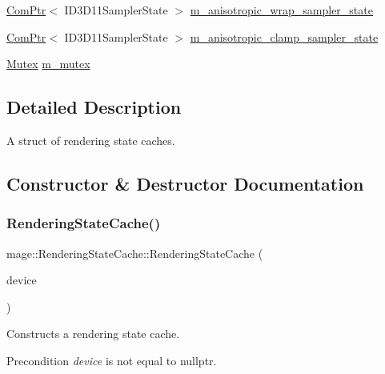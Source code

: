 \begin{DoxyCompactItemize}
\hyperlink{namespacemage_ae74f374780900893caa5555d1031fd79}{Com\+Ptr}$<$ I\+D3\+D11\+Sampler\+State $>$ \hyperlink{structmage_1_1_rendering_state_cache_ac44316b27ee83a1aeb9f8afc26b5a743}{m\+\_\+anisotropic\+\_\+wrap\+\_\+sampler\+\_\+state}
\item 
\hyperlink{namespacemage_ae74f374780900893caa5555d1031fd79}{Com\+Ptr}$<$ I\+D3\+D11\+Sampler\+State $>$ \hyperlink{structmage_1_1_rendering_state_cache_a56467ab3877bfb1fa547efe4e4a62cc7}{m\+\_\+anisotropic\+\_\+clamp\+\_\+sampler\+\_\+state}
\item 
\hyperlink{structmage_1_1_mutex}{Mutex} \hyperlink{structmage_1_1_rendering_state_cache_a97aad58b39eedbeeb27ed47c87ded52a}{m\+\_\+mutex}
\end{DoxyCompactItemize}


\subsection{Detailed Description}
A struct of rendering state caches. 

\subsection{Constructor \& Destructor Documentation}
\hypertarget{structmage_1_1_rendering_state_cache_ad818eaa6c950c5851d6e684b9a4b3a65}{}\label{structmage_1_1_rendering_state_cache_ad818eaa6c950c5851d6e684b9a4b3a65} 
\subsubsection{\texorpdfstring{Rendering\+State\+Cache()}{RenderingStateCache()}\hspace{0.1cm}{\footnotesize\ttfamily [1/3]}}
{\footnotesize\ttfamily mage\+::\+Rendering\+State\+Cache\+::\+Rendering\+State\+Cache (\begin{DoxyParamCaption}\item[{I\+D3\+D11\+Device2 $\ast$}]{device }\end{DoxyParamCaption})\hspace{0.3cm}{\ttfamily [explicit]}}

Constructs a rendering state cache.

\begin{DoxyPrecond}{Precondition}
{\itshape device} is not equal to {\ttfamily nullptr}. 
\end{DoxyPrecond}

